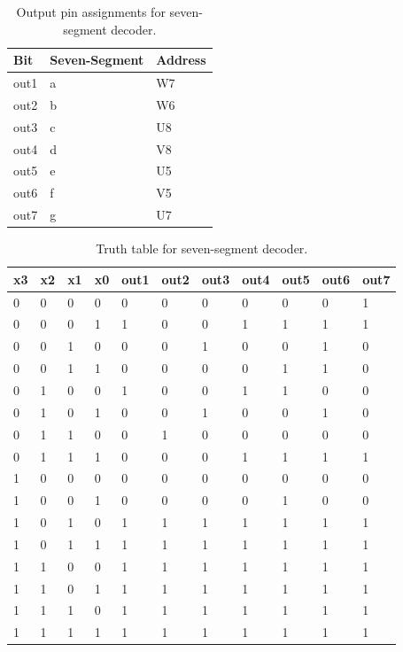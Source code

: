 \documentclass[11pt]{article}
\begin{document}
\begin{table}[h]
\begin{center}
	\begin{tabular}{| l | l | l |}
		\hline
		Bit & Seven-Segment & Address \\ \hline
		out1 & a & W7 \\ \hline
		out2 & b & W6 \\ \hline
		out3 & c & U8 \\ \hline
		out4 & d & V8 \\ \hline
		out5 & e & U5 \\ \hline
		out6 & f & V5 \\ \hline
		out7 & g & U7 \\ \hline
	\end{tabular}
	\caption{\label{tab:table-name}Output pin assignments for seven-segment decoder.}
	\label{tab:sevenSegOutput}
\end{center}
\end{table}

\begin{table}[h]
\begin{center}
	\begin{tabular}{| l | l | l | l | l | l | l | l | l | l | l |}
		\hline
		x3 & x2 & x1 & x0  & out1 & out2 & out3 & out4 & out5 & out6 & out7\\ \hline
		0 & 0 & 0 & 0 & 0 & 0 & 0 & 0 & 0 & 0 & 1 \\ \hline
		0 & 0 & 0 & 1 & 1 & 0 & 0 & 1 & 1 & 1 & 1 \\ \hline
		0 & 0 & 1 & 0 & 0 & 0 & 1 & 0 & 0 & 1 & 0 \\ \hline
		0 & 0 & 1 & 1 & 0 & 0 & 0 & 0 & 1 & 1 & 0 \\ \hline
		0 & 1 & 0 & 0 & 1 & 0 & 0 & 1 & 1 & 0 & 0 \\ \hline
		0 & 1 & 0 & 1 & 0 & 0 & 1 & 0 & 0 & 1 & 0 \\ \hline
		0 & 1 & 1 & 0 & 0 & 1 & 0 & 0 & 0 & 0 & 0 \\ \hline
		0 & 1 & 1 & 1 & 0 & 0 & 0 & 1 & 1 & 1 & 1 \\ \hline
		1 & 0 & 0 & 0 & 0 & 0 & 0 & 0 & 0 & 0 & 0 \\ \hline
		1 & 0 & 0 & 1 & 0 & 0 & 0 & 0 & 1 & 0 & 0 \\ \hline
		1 & 0 & 1 & 0 & 1 & 1 & 1 & 1 & 1 & 1 & 1 \\ \hline
		1 & 0 & 1 & 1 & 1 & 1 & 1 & 1 & 1 & 1 & 1 \\ \hline
		1 & 1 & 0 & 0 & 1 & 1 & 1 & 1 & 1 & 1 & 1 \\ \hline
		1 & 1 & 0 & 1 & 1 & 1 & 1 & 1 & 1 & 1 & 1 \\ \hline
		1 & 1 & 1 & 0 & 1 & 1 & 1 & 1 & 1 & 1 & 1 \\ \hline
		1 & 1 & 1 & 1 & 1 & 1 & 1 & 1 & 1 & 1 & 1 \\ \hline
	\end{tabular}
	\caption{\label{tab:table-name}Truth table for seven-segment decoder.}
	\label{tab:sevenSegTruthTable}
\end{center}
\end{table}
\end{document}

